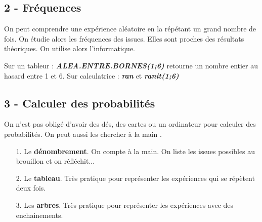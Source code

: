 \documentclass[12pt]{article}
\begin{document}
\subsection*{2 - Fréquences}

On peut comprendre une expérience aléatoire en la répétant un grand nombre de fois. On étudie alors les fréquences des issues. Elles sont proches des résultats théoriques. On utilise alors l'informatique.

Sur un tableur : \textit{\textbf{ALEA.ENTRE.BORNES(1;6)}} retourne un nombre entier au hasard entre 1 et 6.
Sur calculatrice : \textit{\textbf{ran}} et \textit{\textbf{ranit(1;6)}}


\subsection*{3 - Calculer des probabilités}

On n'est pas obligé d'avoir des dés, des cartes ou un ordinateur pour calculer des probabilités. On peut aussi les chercher \og à la main \fg . 

\begin{enumerate}
\item[1.] Le \textbf{dénombrement}. On compte à la main. On liste les issues possibles au brouillon et on réfléchit...
\item[2.] Le \textbf{tableau}. Très pratique pour représenter les expériences qui se répètent deux fois.
\item[3.] Les \textbf{arbres}. Très pratique pour représenter les expériences avec des enchainements.
\end{enumerate}
\end{document}
